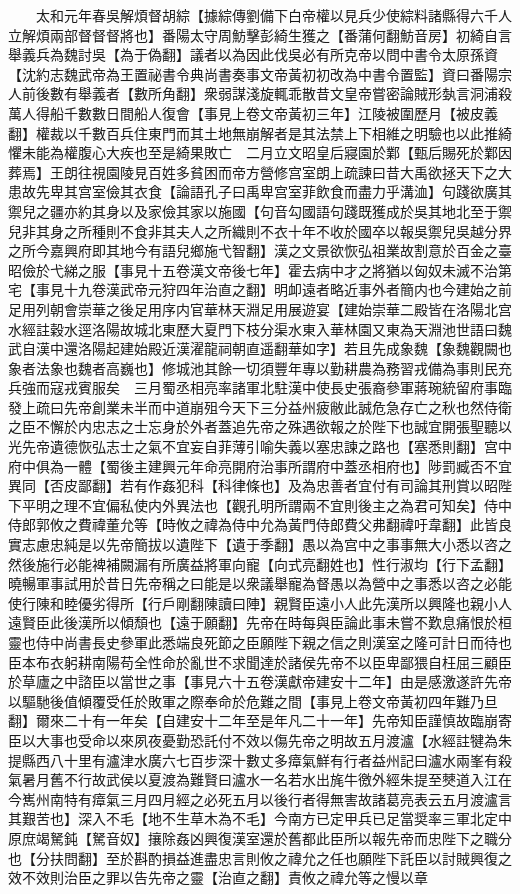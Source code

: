 　　太和元年春吳解煩督胡綜【據綜傳劉備下白帝權以見兵少使綜料諸縣得六千人立解煩兩部督督督將也】番陽太守周魴擊彭綺生獲之【番蒲何翻魴音房】初綺自言舉義兵為魏討吳【為于偽翻】議者以為因此伐吳必有所克帝以問中書令太原孫資【沈約志魏武帝為王置祕書令典尚書奏事文帝黃初初改為中書令置監】資曰番陽宗人前後數有舉義者【數所角翻】衆弱謀淺旋輒乖散昔文皇帝嘗密論賊形埶言洞浦殺萬人得船千數數日間船人復會【事見上卷文帝黃初三年】江陵被圍歷月【被皮義翻】權裁以千數百兵住東門而其土地無崩解者是其法禁上下相維之明驗也以此推綺懼未能為權腹心大疾也至是綺果敗亡　二月立文昭皇后寢園於鄴【甄后賜死於鄴因葬焉】王朗往視園陵見百姓多貧困而帝方營修宫室朗上疏諫曰昔大禹欲拯天下之大患故先卑其宫室儉其衣食【論語孔子曰禹卑宫室菲飲食而盡力乎溝洫】句踐欲廣其禦兒之疆亦約其身以及家儉其家以施國【句音勾國語句踐既獲成於吳其地北至于禦兒非其身之所種則不食非其夫人之所織則不衣十年不收於國卒以報吳禦兒吳越分界之所今嘉興府即其地今有語兒鄉施弋智翻】漢之文景欲恢弘祖業故割意於百金之臺昭儉於弋綈之服【事見十五卷漢文帝後七年】霍去病中才之將猶以匈奴未滅不治第宅【事見十九卷漢武帝元狩四年治直之翻】明卹遠者略近事外者簡内也今建始之前足用列朝會崇華之後足用序内官華林天淵足用展遊宴【建始崇華二殿皆在洛陽北宫水經註穀水逕洛陽故城北東歷大夏門下枝分渠水東入華林園又東為天淵池世語曰魏武自漢中還洛陽起建始殿近漢濯龍祠朝直遥翻華如字】若且先成象魏【象魏觀闕也象者法象也魏者高巍也】修城池其餘一切須豐年專以勤耕農為務習戎備為事則民充兵強而寇戎賓服矣　三月蜀丞相亮率諸軍北駐漢中使長史張裔參軍蔣琬統留府事臨發上疏曰先帝創業未半而中道崩殂今天下三分益州疲敝此誠危急存亡之秋也然侍衛之臣不懈於内忠志之士忘身於外者蓋追先帝之殊遇欲報之於陛下也誠宜開張聖聽以光先帝遺德恢弘志士之氣不宜妄自菲薄引喻失義以塞忠諫之路也【塞悉則翻】宫中府中俱為一體【蜀後主建興元年命亮開府治事所謂府中蓋丞相府也】陟罰臧否不宜異同【否皮鄙翻】若有作姦犯科【科律條也】及為忠善者宜付有司論其刑賞以昭陛下平明之理不宜偏私使内外異法也【觀孔明所謂兩不宜則後主之為君可知矣】侍中侍郎郭攸之費禕董允等【時攸之禕為侍中允為黃門侍郎費父弗翻禕吁韋翻】此皆良實志慮忠純是以先帝簡拔以遺陛下【遺于季翻】愚以為宫中之事事無大小悉以咨之然後施行必能裨補闕漏有所廣益將軍向寵【向式亮翻姓也】性行淑均【行下孟翻】曉暢軍事試用於昔日先帝稱之曰能是以衆議舉寵為督愚以為營中之事悉以咨之必能使行陳和睦優劣得所【行戶剛翻陳讀曰陣】親賢臣遠小人此先漢所以興隆也親小人遠賢臣此後漢所以傾頹也【遠于願翻】先帝在時每與臣論此事未嘗不歎息痛恨於桓靈也侍中尚書長史參軍此悉端良死節之臣願陛下親之信之則漢室之隆可計日而待也臣本布衣躬耕南陽苟全性命於亂世不求聞達於諸侯先帝不以臣卑鄙猥自枉屈三顧臣於草廬之中諮臣以當世之事【事見六十五卷漢獻帝建安十二年】由是感激遂許先帝以驅馳後值傾覆受任於敗軍之際奉命於危難之間【事見上卷文帝黃初四年難乃旦翻】爾來二十有一年矣【自建安十二年至是年凡二十一年】先帝知臣謹慎故臨崩寄臣以大事也受命以來夙夜憂勤恐託付不效以傷先帝之明故五月渡瀘【水經註犍為朱提縣西八十里有瀘津水廣六七百步深十數丈多瘴氣鮮有行者益州記曰瀘水兩峯有殺氣暑月舊不行故武侯以夏渡為難賢曰瀘水一名若水出旄牛徼外經朱提至僰道入江在今嶲州南特有瘴氣三月四月經之必死五月以後行者得無害故諸葛亮表云五月渡瀘言其艱苦也】深入不毛【地不生草木為不毛】今南方已定甲兵已足當奨率三軍北定中原庶竭駑鈍【駑音奴】攘除姦凶興復漢室還於舊都此臣所以報先帝而忠陛下之職分也【分扶問翻】至於斟酌損益進盡忠言則攸之禕允之任也願陛下託臣以討賊興復之效不效則治臣之罪以告先帝之靈【治直之翻】責攸之禕允等之慢以章
